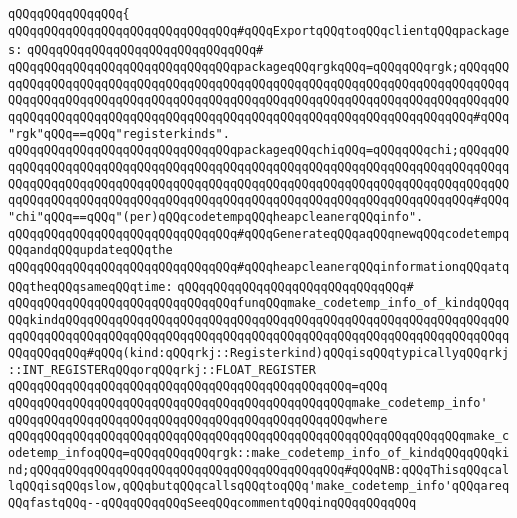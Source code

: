 \verb|qQQqqQQqqQQqqQQq{|\newline
\verb|qQQqqQQqqQQqqQQqqQQqqQQqqQQqqQQq#qQQqExportqQQqtoqQQqclientqQQqpackages:|\newline
\verb|qQQqqQQqqQQqqQQqqQQqqQQqqQQqqQQq#|\newline
\verb|qQQqqQQqqQQqqQQqqQQqqQQqqQQqqQQqpackageqQQqrgkqQQq=qQQqqQQqrgk;qQQqqQQqqQQqqQQqqQQqqQQqqQQqqQQqqQQqqQQqqQQqqQQqqQQqqQQqqQQqqQQqqQQqqQQqqQQqqQQqqQQqqQQqqQQqqQQqqQQqqQQqqQQqqQQqqQQqqQQqqQQqqQQqqQQqqQQqqQQqqQQqqQQqqQQqqQQqqQQqqQQqqQQqqQQqqQQqqQQqqQQqqQQqqQQqqQQqqQQqqQQqqQQqqQQq#qQQq"rgk"qQQq==qQQq"registerkinds".|\newline
\verb|qQQqqQQqqQQqqQQqqQQqqQQqqQQqqQQqpackageqQQqchiqQQq=qQQqqQQqchi;qQQqqQQqqQQqqQQqqQQqqQQqqQQqqQQqqQQqqQQqqQQqqQQqqQQqqQQqqQQqqQQqqQQqqQQqqQQqqQQqqQQqqQQqqQQqqQQqqQQqqQQqqQQqqQQqqQQqqQQqqQQqqQQqqQQqqQQqqQQqqQQqqQQqqQQqqQQqqQQqqQQqqQQqqQQqqQQqqQQqqQQqqQQqqQQqqQQqqQQqqQQqqQQqqQQq#qQQq"chi"qQQq==qQQq"(per)qQQqcodetempqQQqheapcleanerqQQqinfo".|\newline
\newline
\newline
\verb|qQQqqQQqqQQqqQQqqQQqqQQqqQQqqQQq#qQQqGenerateqQQqaqQQqnewqQQqcodetempqQQqandqQQqupdateqQQqthe|\newline
\verb|qQQqqQQqqQQqqQQqqQQqqQQqqQQqqQQq#qQQqheapcleanerqQQqinformationqQQqatqQQqtheqQQqsameqQQqtime:|\newline
\verb|qQQqqQQqqQQqqQQqqQQqqQQqqQQqqQQq#|\newline
\verb|qQQqqQQqqQQqqQQqqQQqqQQqqQQqqQQqfunqQQqmake_codetemp_info_of_kindqQQqqQQqkindqQQqqQQqqQQqqQQqqQQqqQQqqQQqqQQqqQQqqQQqqQQqqQQqqQQqqQQqqQQqqQQqqQQqqQQqqQQqqQQqqQQqqQQqqQQqqQQqqQQqqQQqqQQqqQQqqQQqqQQqqQQqqQQqqQQqqQQqqQQqqQQq#qQQq(kind:qQQqrkj::Registerkind)qQQqisqQQqtypicallyqQQqrkj::INT_REGISTERqQQqorqQQqrkj::FLOAT_REGISTER|\newline
\verb|qQQqqQQqqQQqqQQqqQQqqQQqqQQqqQQqqQQqqQQqqQQqqQQq=qQQq|\newline
\verb|qQQqqQQqqQQqqQQqqQQqqQQqqQQqqQQqqQQqqQQqqQQqqQQqmake_codetemp_info'|\newline
\verb|qQQqqQQqqQQqqQQqqQQqqQQqqQQqqQQqqQQqqQQqqQQqqQQqwhere|\newline
\verb|qQQqqQQqqQQqqQQqqQQqqQQqqQQqqQQqqQQqqQQqqQQqqQQqqQQqqQQqqQQqqQQqmake_codetemp_infoqQQq=qQQqqQQqqQQqrgk::make_codetemp_info_of_kindqQQqqQQqkind;qQQqqQQqqQQqqQQqqQQqqQQqqQQqqQQqqQQqqQQqqQQq#qQQqNB:qQQqThisqQQqcallqQQqisqQQqslow,qQQqbutqQQqcallsqQQqtoqQQq'make_codetemp_info'qQQqareqQQqfastqQQq--qQQqqQQqqQQqSeeqQQqcommentqQQqinqQQqqQQqqQQq|\newline
